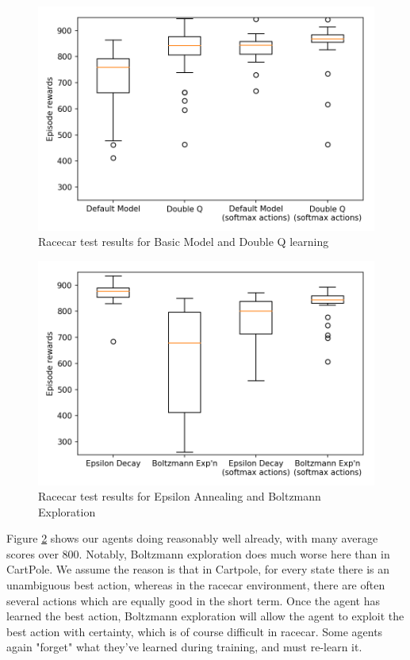 \documentclass[a4paper, 11pt, conference]{ieeeconf}      %
\begin{document}
\begin{figure}
  \includegraphics[width=\linewidth]{figs/racecar_1.png}
  \caption{Racecar test results for Basic Model and Double Q learning}
  \label{fig:test1}
\end{figure}

\begin{figure}
  \includegraphics[width=\linewidth]{figs/racecar_2.png}
  \caption{Racecar test results for Epsilon Annealing and Boltzmann Exploration}
  \label{fig:test2}
\end{figure}

Figure \ref{fig:test2} shows our agents doing reasonably well already, with many average scores over 800. Notably, Boltzmann exploration does much worse here than in CartPole. We assume the reason is that in Cartpole, for every state there is an unambiguous best action, whereas in the racecar environment, there are often several actions which are equally good in the short term. Once the agent has learned the best action, Boltzmann exploration will allow the agent to exploit the best action with certainty, which is of course difficult in racecar. Some agents again "forget" what they've learned during training, and must re-learn it.
\end{document}
